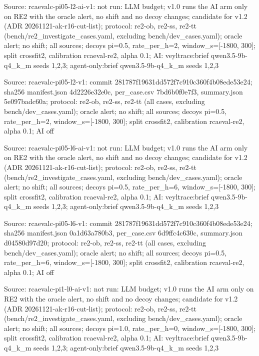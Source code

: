 \noindent Source: rcaevalc-pi05-l2-ai-v1: not run: LLM budget; v1.0 runs the AI arm only on RE2 with the oracle alert, no shift and no decoy changes; candidate for v1.2 (ADR 20261121-ak-r16-cut-list); protocol: re2-ob, re2-ss, re2-tt (bench/\allowbreak{}re2\_investigate\_cases.yaml, excluding bench/\allowbreak{}dev\_cases.yaml); oracle alert; no shift; all sources; decoys pi=0.5, rate\_per\_h=2, window\_s=[-1800, 300]; split crossfit2, calibration rcaeval-re2, alpha 0.1; AI: veyltrace:brief qwen3.5-9b-q4\_k\_m seeds 1,2,3; agent-only:brief qwen3.5-9b-q4\_k\_m seeds 1,2,3\par
\noindent Source: rcaevalc-pi05-l2-v1: commit 281787f19631dd572f7c910c360f4b08ede53e24; sha256 manifest.json 4d2226e32e0c, per\_case.csv 7bd6b0f0e7f3, summary.json 5e097badc60a; protocol: re2-ob, re2-ss, re2-tt (all cases, excluding bench/\allowbreak{}dev\_cases.yaml); oracle alert; no shift; all sources; decoys pi=0.5, rate\_per\_h=2, window\_s=[-1800, 300]; split crossfit2, calibration rcaeval-re2, alpha 0.1; AI off\par
\noindent Source: rcaevalc-pi05-l6-ai-v1: not run: LLM budget; v1.0 runs the AI arm only on RE2 with the oracle alert, no shift and no decoy changes; candidate for v1.2 (ADR 20261121-ak-r16-cut-list); protocol: re2-ob, re2-ss, re2-tt (bench/\allowbreak{}re2\_investigate\_cases.yaml, excluding bench/\allowbreak{}dev\_cases.yaml); oracle alert; no shift; all sources; decoys pi=0.5, rate\_per\_h=6, window\_s=[-1800, 300]; split crossfit2, calibration rcaeval-re2, alpha 0.1; AI: veyltrace:brief qwen3.5-9b-q4\_k\_m seeds 1,2,3; agent-only:brief qwen3.5-9b-q4\_k\_m seeds 1,2,3\par
\noindent Source: rcaevalc-pi05-l6-v1: commit 281787f19631dd572f7c910c360f4b08ede53e24; sha256 manifest.json 0a1d63a780b3, per\_case.csv 6d9ffc4c630c, summary.json d04580d97d20; protocol: re2-ob, re2-ss, re2-tt (all cases, excluding bench/\allowbreak{}dev\_cases.yaml); oracle alert; no shift; all sources; decoys pi=0.5, rate\_per\_h=6, window\_s=[-1800, 300]; split crossfit2, calibration rcaeval-re2, alpha 0.1; AI off\par
\noindent Source: rcaevalc-pi1-l0-ai-v1: not run: LLM budget; v1.0 runs the AI arm only on RE2 with the oracle alert, no shift and no decoy changes; candidate for v1.2 (ADR 20261121-ak-r16-cut-list); protocol: re2-ob, re2-ss, re2-tt (bench/\allowbreak{}re2\_investigate\_cases.yaml, excluding bench/\allowbreak{}dev\_cases.yaml); oracle alert; no shift; all sources; decoys pi=1.0, rate\_per\_h=0, window\_s=[-1800, 300]; split crossfit2, calibration rcaeval-re2, alpha 0.1; AI: veyltrace:brief qwen3.5-9b-q4\_k\_m seeds 1,2,3; agent-only:brief qwen3.5-9b-q4\_k\_m seeds 1,2,3\par
